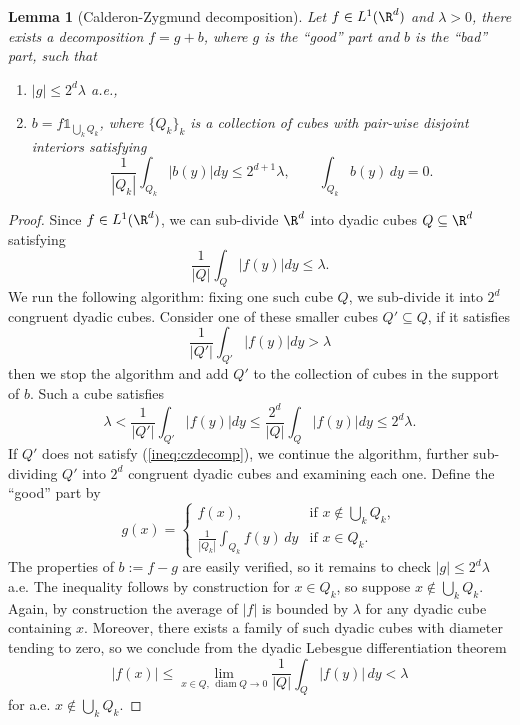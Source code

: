 \documentclass[reqno]{amsart}
\newtheorem{lemma}[theorem]{Lemma}
\theoremstyle{definition}
\theoremstyle{remark}
\begin{document}
\begin{lemma}[Calderon-Zygmund decomposition]
	Let $f \in L^1 (\R^d)$ and $\lambda > 0$, there exists a decomposition $f = g + b$, where $g$ is the ``good'' part and $b$ is the ``bad'' part, such that 
	\begin{enumerate}
		\item $|g| \leq 2^d \lambda$ a.e.,
		\item $b = f \mathbb 1_{\bigcup_k Q_k}$, where $\{Q_k\}_k$ is a collection of cubes with pair-wise disjoint interiors satisfying
						\[ \frac{1}{|Q_k|} \int_{Q_k} |b(y)| dy \leq 2^{d + 1} \lambda, \qquad \int_{Q_k} b(y) \, dy = 0. \]
	\end{enumerate}
\end{lemma}

\begin{proof}
	Since $f \in L^1 (\R^d)$, we can sub-divide $\R^d$ into dyadic cubes $Q \subseteq \R^d$ satisfying
		\[ \frac{1}{|Q|} \int_Q |f(y)| dy \leq \lambda. \]
	We run the following algorithm: fixing one such cube $Q$, we sub-divide it into $2^d$ congruent dyadic cubes. Consider one of these smaller cubes $Q' \subseteq Q$, if it satisfies 
		\begin{equation}
			\frac{1}{|Q'|} \int_{Q'} |f(y)| dy > \lambda
			\tag{*}
			\label{ineq:czdecomp} 
		\end{equation}	
	then we stop the algorithm and add $Q'$ to the collection of cubes in the support of $b$. Such a cube satisfies
		\[ \lambda <\frac{1}{|Q'|} \int_{Q'} |f(y)| dy \leq \frac{2^d}{|Q|} \int_Q |f(y)| dy \leq 2^d \lambda.  \]
	If $Q'$ does not satisfy (\ref{ineq:czdecomp}), we continue the algorithm, further sub-dividing $Q'$ into $2^d$ congruent dyadic cubes and examining each one. Define the ``good'' part by 
		\[ g(x)
			=
			\begin{cases}
				f(x), 	
					&\text{if } x \not\in \bigcup_k Q_k, \\
				\frac{1}{|Q_k|} \int_{Q_k} f(y) \, dy
					&\text{if } x \in Q_k.	
			\end{cases}
		 \]
	The properties of $b := f - g$ are easily verified, so it remains to check $|g| \leq 2^d \lambda$ a.e. The inequality follows by construction for $x \in Q_k$, so suppose $x \not\in \bigcup_k Q_k$. Again, by construction the average of $|f|$ is bounded by $\lambda$ for any dyadic cube containing $x$. Moreover, there exists a family of such dyadic cubes with diameter tending to zero, so we conclude from the dyadic Lebesgue differentiation theorem
		\[ |f(x)| \leq \lim_{x \in Q,  \, \operatorname{diam} Q \to 0}\frac{1}{|Q|} \int_Q |f(y)| \, dy < \lambda\]
	for a.e. $x \not\in \bigcup_k Q_k$.
\end{proof}
\end{document}

